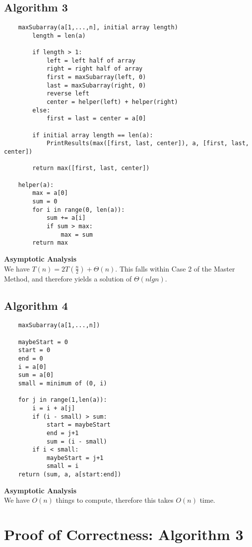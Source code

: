 \documentclass[11pt,letterpaper]{article}
\begin{document}
\subsection{Algorithm 3}
\begin{verbatim}
    maxSubarray(a[1,...,n], initial array length)
        length = len(a)

        if length > 1:
            left = left half of array
            right = right half of array
            first = maxSubarray(left, 0)
            last = maxSubarray(right, 0)
            reverse left
            center = helper(left) + helper(right)
        else:
            first = last = center = a[0]

        if initial array length == len(a):
            PrintResults(max([first, last, center]), a, [first, last, center])

        return max([first, last, center])

    helper(a):
        max = a[0]
        sum = 0
        for i in range(0, len(a)):
            sum += a[i]
            if sum > max:
                max = sum
        return max
\end{verbatim}
\textbf{Asymptotic Analysis}\\
We have $T(n) = 2T(\frac{n}{2}) + \Theta(n)$. This falls within Case 2 of the Master Method, and therefore yields a solution of $\Theta(nlgn)$.

\subsection{Algorithm 4}
\begin{verbatim}
    maxSubarray(a[1,...,n])

    maybeStart = 0
    start = 0
    end = 0
    i = a[0]
    sum = a[0]
    small = minimum of (0, i)

    for j in range(1,len(a)):
        i = i + a[j]
        if (i - small) > sum:
            start = maybeStart
            end = j+1
            sum = (i - small)
        if i < small:
            maybeStart = j+1
            small = i
    return (sum, a, a[start:end])
\end{verbatim}
\textbf{Asymptotic Analysis}\\
We have $O(n)$ things to compute, therefore this takes $O(n)$ time.


\section{Proof of Correctness: Algorithm 3}
\end{document}
